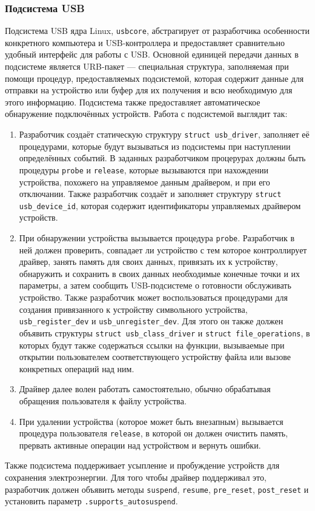 \documentclass[a4paper,12pt]{report}
\numberwithin{equation}{section}
\begin{document}
\subsubsection{Подсистема USB}
Подсистема USB ядра Linux, \texttt{usbcore}, абстрагирует от разработчика
особенности конкретного компьютера и USB-контроллера и предоставляет
сравнительно удобный интерфейс для работы с USB. Основной единицей передачи
данных в подсистеме является URB-пакет --- специальная структура, заполняемая
при помощи процедур, предоставляемых подсистемой, которая содержит данные для
отправки на устройство или буфер для их получения и всю необходимую для этого
информацию. Подсистема также предоставляет автоматическое обнаружение
подключённых устройств. Работа с подсистемой выглядит так:
\begin{enumerate}
\item Разработчик создаёт статическую структуру \texttt{struct usb\_driver},
  заполняет её процедурами, которые будут вызываться из подсистемы при
  наступлении определённых событий. В заданных разработчиком процерурах должны
  быть процедуры \texttt{probe} и \texttt{release}, которые вызываются при
  нахождении устройства, похожего на управляемое данным драйвером, и при его
  отключании. Также разработчик создаёт и заполняет структуру \texttt{struct
    usb\_device\_id}, которая содержит идентификаторы управляемых драйвером
  устройств.
\item При обнаружении устройства вызывается процедура
  \texttt{probe}. Разработчик в ней должен проверить, совпадает ли устройство с
  тем которое контроллирует драйвер, занять память для своих данных, привязать
  их к устройству, обнаружить и сохранить в своих данных необходимые конечные
  точки и их параметры, а затем сообщить USB-подсистеме о готовности обслуживать
  устройство. Также разработчик может воспользоваться процедурами для создания
  привязанного к устройству символьного устройства, \texttt{usb\_register\_dev} и
  \texttt{usb\_unregister\_dev}. Для этого он также должен объявить структуры
  \texttt{struct usb\_class\_driver} и \texttt{struct file\_operations}, в которых
  будут также содержаться ссылки на функции, вызываемые при открытии
  пользователем соответствующего устройству файла или вызове конкретных операций
  над ним.
\item Драйвер далее волен работать самостоятельно, обычно обрабатывая обращения
  пользователя к файлу устройства.
\item При удалении устройства (которое может быть внезапным) вызывается
  процедура пользователя \texttt{release}, в которой он должен очистить память,
  прервать активные операции над устройством и вернуть ошибки.
\end{enumerate}
Также подсистема поддерживает усыпление и пробуждение устройств для сохранения
электроэнергии. Для того чтобы драйвер поддерживал это, разработчик должен
объявить методы \texttt{suspend}, \texttt{resume}, \texttt{pre\_reset},
\texttt{post\_reset} и установить параметр \texttt{.supports\_autosuspend}.
\end{document}
